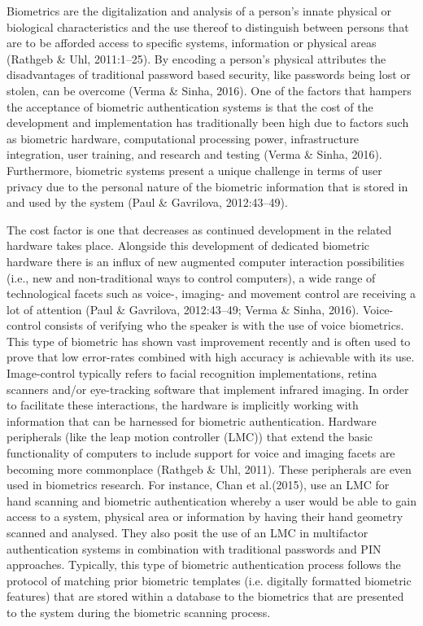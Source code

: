 Biometrics are the digitalization and analysis of a person’s innate physical or biological characteristics and the use thereof to distinguish between persons that are to be afforded access to specific systems, information or physical areas (Rathgeb \& Uhl, 2011:1–25). By encoding a person’s physical attributes the disadvantages of traditional password based security, like passwords being lost or stolen, can be overcome (Verma \& Sinha, 2016). One of the factors that hampers the acceptance of biometric authentication systems is that the cost of the development and implementation has traditionally been high due to factors such as biometric hardware, computational processing power, infrastructure integration, user training, and research and testing (Verma \& Sinha, 2016). Furthermore, biometric systems present a unique challenge in terms of user privacy due to the personal nature of the biometric information that is stored in and used by the system (Paul \& Gavrilova, 2012:43–49).

The cost factor is one that decreases as continued development in the related hardware takes place. Alongside this development of dedicated biometric hardware there is an influx of new augmented computer interaction possibilities (i.e., new and non-traditional ways to control computers), a wide range of technological facets such as voice-, imaging- and movement control are receiving a lot of attention (Paul \& Gavrilova, 2012:43–49; Verma \& Sinha, 2016). Voice-control consists of verifying who the speaker is with the use of voice biometrics. This type of biometric has shown vast improvement recently and is often used to prove that low error-rates combined with high accuracy is achievable with its use. Image-control typically refers to facial recognition implementations, retina scanners and/or eye-tracking software that implement infrared imaging. In order to facilitate these interactions, the hardware is implicitly working with information that can be harnessed for biometric authentication. Hardware peripherals (like the leap motion controller (LMC)) that extend the basic functionality of computers to include support for voice and imaging facets are becoming more commonplace (Rathgeb \& Uhl, 2011). These peripherals are even used in biometrics research. For instance, Chan et al.(2015), use an LMC for hand scanning and biometric authentication whereby a user would be able to gain access to a system, physical area or information by having their hand geometry scanned and analysed. They also posit the use of an LMC in multifactor authentication systems in combination with traditional passwords and PIN approaches. 
Typically, this type of biometric authentication process follows the protocol of matching prior biometric templates (i.e. digitally formatted biometric features) that are stored within a database to the biometrics that are presented to the system during the biometric scanning process. 

